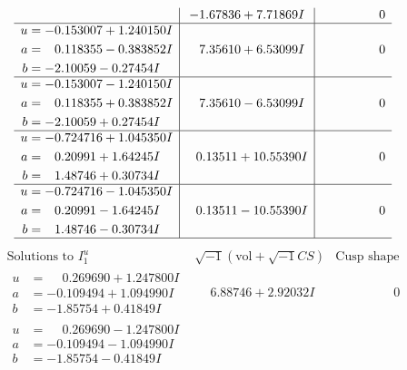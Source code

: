 \documentclass[1p]{elsarticle_modified}
\theoremstyle{definition}
\newcommand{\I}{\sqrt{-1}}
\begin{document}
$$\begin{array}{c|c|c}
 & -1.67836 + 7.71869 I & \phantom{-0.000000 } 0 \\ \hline\begin{aligned}
u &= -0.153007 + 1.240150 I \\
a &= \phantom{-}0.118355 - 0.383852 I \\
b &= -2.10059 - 0.27454 I\end{aligned}
 & \phantom{-}7.35610 + 6.53099 I & \phantom{-0.000000 } 0 \\ \hline\begin{aligned}
u &= -0.153007 - 1.240150 I \\
a &= \phantom{-}0.118355 + 0.383852 I \\
b &= -2.10059 + 0.27454 I\end{aligned}
 & \phantom{-}7.35610 - 6.53099 I & \phantom{-0.000000 } 0 \\ \hline\begin{aligned}
u &= -0.724716 + 1.045350 I \\
a &= \phantom{-}0.20991 + 1.64245 I \\
b &= \phantom{-}1.48746 + 0.30734 I\end{aligned}
 & \phantom{-}0.13511 + 10.55390 I & \phantom{-0.000000 } 0 \\ \hline\begin{aligned}
u &= -0.724716 - 1.045350 I \\
a &= \phantom{-}0.20991 - 1.64245 I \\
b &= \phantom{-}1.48746 - 0.30734 I\end{aligned}
 & \phantom{-}0.13511 - 10.55390 I & \phantom{-0.000000 } 0\\
 \hline 
 \end{array}$$\newpage$$\begin{array}{c|c|c}  
\text{Solutions to }I^u_{1}& \I (\text{vol} + \sqrt{-1}CS) & \text{Cusp shape}\\
 \hline 
\begin{aligned}
u &= \phantom{-}0.269690 + 1.247800 I \\
a &= -0.109494 + 1.094990 I \\
b &= -1.85754 + 0.41849 I\end{aligned}
 & \phantom{-}6.88746 + 2.92032 I & \phantom{-0.000000 } 0 \\ \hline\begin{aligned}
u &= \phantom{-}0.269690 - 1.247800 I \\
a &= -0.109494 - 1.094990 I \\
b &= -1.85754 - 0.41849 I\end{aligned}

\end{array}$$
\end{document}
